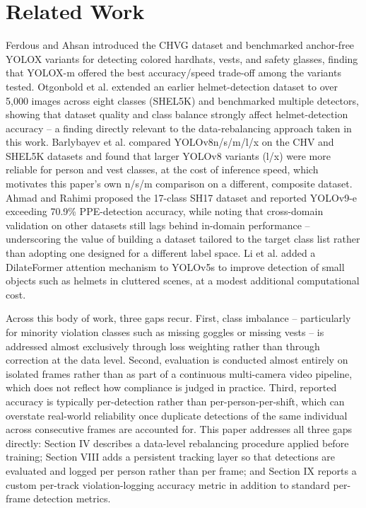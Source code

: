 \documentclass[conference]{IEEEtran}
\begin{document}
\section{Related Work}

Ferdous and Ahsan \cite{b1} introduced the CHVG dataset and benchmarked anchor-free YOLOX variants for detecting colored hardhats, vests, and safety glasses, finding that YOLOX-m offered the best accuracy/speed trade-off among the variants tested. Otgonbold et al. \cite{b2} extended an earlier helmet-detection dataset to over 5,000 images across eight classes (SHEL5K) and benchmarked multiple detectors, showing that dataset quality and class balance strongly affect helmet-detection accuracy -- a finding directly relevant to the data-rebalancing approach taken in this work. Barlybayev et al. \cite{b3} compared YOLOv8n/s/m/l/x on the CHV and SHEL5K datasets and found that larger YOLOv8 variants (l/x) were more reliable for person and vest classes, at the cost of inference speed, which motivates this paper's own n/s/m comparison on a different, composite dataset. Ahmad and Rahimi \cite{b4} proposed the 17-class SH17 dataset and reported YOLOv9-e exceeding 70.9\% PPE-detection accuracy, while noting that cross-domain validation on other datasets still lags behind in-domain performance -- underscoring the value of building a dataset tailored to the target class list rather than adopting one designed for a different label space. Li et al. \cite{b5} added a DilateFormer attention mechanism to YOLOv5s to improve detection of small objects such as helmets in cluttered scenes, at a modest additional computational cost.

Across this body of work, three gaps recur. First, class imbalance -- particularly for minority violation classes such as missing goggles or missing vests -- is addressed almost exclusively through loss weighting rather than through correction at the data level. Second, evaluation is conducted almost entirely on isolated frames rather than as part of a continuous multi-camera video pipeline, which does not reflect how compliance is judged in practice. Third, reported accuracy is typically per-detection rather than per-person-per-shift, which can overstate real-world reliability once duplicate detections of the same individual across consecutive frames are accounted for. This paper addresses all three gaps directly: Section IV describes a data-level rebalancing procedure applied before training; Section VIII adds a persistent tracking layer so that detections are evaluated and logged per person rather than per frame; and Section IX reports a custom per-track violation-logging accuracy metric in addition to standard per-frame detection metrics.
\end{document}
